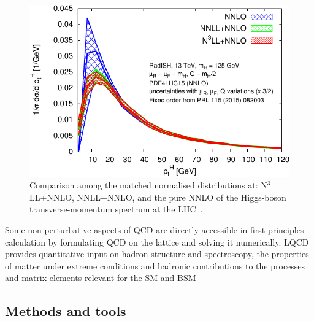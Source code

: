 \begin{figure}[hbt]
 \centering
\includegraphics[scale=0.78]{Strong-Interaction/2matched_fixed-order_nnlo}
 \caption{Comparison among the matched normalised distributions  at:  N$^3$LL+NNLO, NNLL+NNLO, and the pure NNLO of the Higgs-boson transverse-momentum spectrum at the LHC~\cite{Bizon:2017rah}.  }
 \label{NLL}
\end{figure}
Some non-perturbative aspects  of QCD are  directly  accessible in   first-principles
calculation by formulating QCD on the lattice and  solving it numerically. LQCD provides quantitative input on hadron structure and spectroscopy,  the properties  of matter  under extreme conditions and  hadronic  contributions  to the processes and matrix elements relevant for the  SM and BSM~\cite{Aoki,Cirigliano:2019jig,Bazavov:2019lgz,Lehner:2019wvv,DeGrand:2015zxa}


\subsection{Methods and tools}

